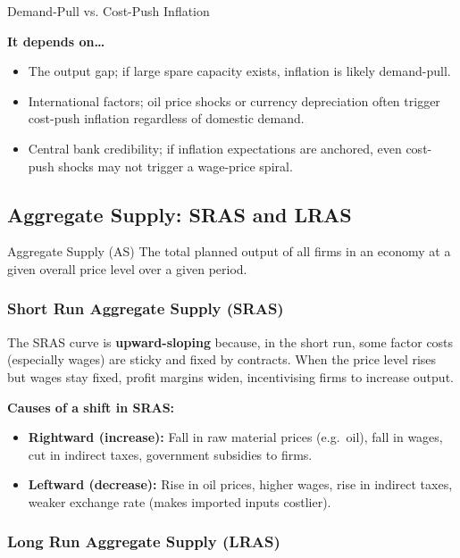 \documentclass[11pt, a4paper, twoside]{book}
\begin{document}
\begin{evaluation}{Demand-Pull vs. Cost-Push Inflation}
\begin{itemize}[leftmargin=*, nosep]
\end{itemize}
\textbf{It depends on\ldots}
\begin{itemize}[leftmargin=*, nosep]
\item The output gap; if large spare capacity exists, inflation is likely demand-pull.
\item International factors; oil price shocks or currency depreciation often trigger cost-push inflation regardless of domestic demand.
\item Central bank credibility; if inflation expectations are anchored, even cost-push shocks may not trigger a wage-price spiral.
\end{itemize}
\end{evaluation}

\subsection{Aggregate Supply: SRAS and LRAS}

\begin{keyterm}{Aggregate Supply (AS)}
The total planned output of all firms in an economy at a given overall price level over a given period.
\end{keyterm}

\subsubsection{Short Run Aggregate Supply (SRAS)}

The SRAS curve is \textbf{upward-sloping} because, in the short run, some factor costs (especially wages) are sticky and fixed by contracts. When the price level rises but wages stay fixed, profit margins widen, incentivising firms to increase output.

\textbf{Causes of a shift in SRAS:}
\begin{itemize}
  \item \textbf{Rightward (increase):} Fall in raw material prices (e.g.\ oil), fall in wages, cut in indirect taxes, government subsidies to firms.
  \item \textbf{Leftward (decrease):} Rise in oil prices, higher wages, rise in indirect taxes, weaker exchange rate (makes imported inputs costlier).
\end{itemize}

\subsubsection{Long Run Aggregate Supply (LRAS)}
\end{document}

